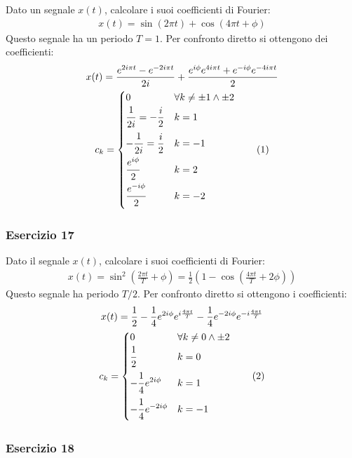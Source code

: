 \documentclass{article}
\newcommand{\tageq}{\tag{\stepcounter{equation}\theequation}}
\newcommand{\Frac}[2]{\displaystyle\frac{\strut{#1}}{\strut{#2}}}
\begin{document}
Dato un segnale $x(t)$, calcolare i suoi coefficienti di Fourier:
\begin{gather*}
    x(t)=\sin\displaystyle(2\pi t)+\cos(4\pi t+\phi)
\end{gather*}
Questo segnale ha un periodo $T=1$. Per confronto diretto si ottengono dei coefficienti:
\begin{gather*}
    x(t)=\displaystyle \frac{e^{2i\pi t}-e^{-2i\pi t}}{2i}+\frac{e^{i\phi}e^{4i\pi t}+e^{-i\phi}e^{-4i\pi t}}{2}\\
    c_k=
    \begin{cases}
        0&\forall k\neq\pm1\land\pm2\\
        \displaystyle\Frac{1}{2i}=-\frac{i}{2} &k=1\\
        -\displaystyle\Frac{1}{2i}=\frac{i}{2}&k=-1\\
        \displaystyle\Frac{e^{i\phi}}{2}&k=2\\
        \displaystyle\Frac{e^{-i\phi}}{2}&k=-2
    \end{cases}\tageq
\end{gather*}

\subsubsection*{Esercizio 17}

Dato il segnale $x(t)$, calcolare i suoi coefficienti di Fourier:
\begin{gather*}
    x(t)=\sin^2\displaystyle\left(\frac{2\pi t}{T}+\phi\right)=\frac{1}{2}\left(1-\cos\left(\frac{4\pi t}{T}+2\phi\right)\right)
\end{gather*}
Questo segnale ha periodo $T/2$. Per confronto diretto si ottengono i coefficienti:
\begin{gather*}
    x(t)=\displaystyle\frac{1}{2}-\frac{1}{4}e^{2i\phi}e^{i\frac{4\pi t}{T}}-\frac{1}{4}e^{-2i\phi}e^{-i\frac{4\pi t}{T}}\\
    c_k=\begin{cases}
        0&\forall k\neq0\land\pm2\\
        \displaystyle\Frac{1}{2}&k=0\\
        -\displaystyle\Frac{1}{4}e^{2i\phi}&k=1\\
        -\displaystyle\Frac{1}{4}e^{-2i\phi}&k=-1
    \end{cases}\tageq
\end{gather*}

\subsubsection*{Esercizio 18}
\end{document}
